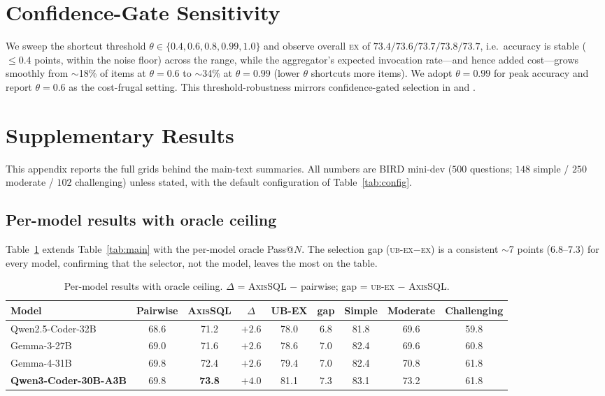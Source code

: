 \documentclass{article}
\newcommand{\sys}{\textsc{AxisSQL}\xspace}
\newcommand{\ex}{\textsc{ex}\xspace}
\begin{document}
\section{Confidence-Gate Sensitivity}
\label{app:gate}
We sweep the shortcut threshold $\theta\in\{0.4,0.6,0.8,0.99,1.0\}$ and observe overall \ex{} of $73.4/73.6/73.7/73.8/73.7$, i.e.\ accuracy is stable ($\le 0.4$ points, within the noise floor) across the range, while the aggregator's expected invocation rate---and hence added cost---grows smoothly from $\sim$18\% of items at $\theta{=}0.6$ to $\sim$34\% at $\theta{=}0.99$ (lower $\theta$ shortcuts more items). We adopt $\theta{=}0.99$ for peak accuracy and report $\theta{=}0.6$ as the cost-frugal setting. This threshold-robustness mirrors confidence-gated selection in \citet{lee2026aggagent} and \citet{li2026deepeye}.

\section{Supplementary Results}
\label{app:supp}

This appendix reports the full grids behind the main-text summaries. All numbers are BIRD mini-dev ($500$ questions; $148$ simple / $250$ moderate / $102$ challenging) unless stated, with the default configuration of Table~\ref{tab:config}.

\subsection{Per-model results with oracle ceiling}
\label{app:permodel}
Table~\ref{tab:s-permodel} extends Table~\ref{tab:main} with the per-model oracle Pass@$N$. The selection gap (\textsc{ub-ex}$-$\ex) is a consistent $\sim$7 points ($6.8$--$7.3$) for every model, confirming that the selector, not the model, leaves the most on the table.

\begin{table}[h]
\centering\small
\caption{Per-model results with oracle ceiling. $\Delta$ = \sys{} $-$ pairwise; gap = \textsc{ub-ex} $-$ \sys.}
\label{tab:s-permodel}
\begin{tabular}{@{}lcccccccc@{}}
\toprule
\textbf{Model} & \textbf{Pairwise} & \textbf{\sys} & $\Delta$ & \textbf{UB-EX} & \textbf{gap} & \textbf{Simple} & \textbf{Moderate} & \textbf{Challenging} \\
\midrule
Qwen2.5-Coder-32B    & 68.6 & 71.2 & $+2.6$ & 78.0 & 6.8 & 81.8 & 69.6 & 59.8 \\
Gemma-3-27B          & 69.0 & 71.6 & $+2.6$ & 78.6 & 7.0 & 82.4 & 69.6 & 60.8 \\
Gemma-4-31B          & 69.8 & 72.4 & $+2.6$ & 79.4 & 7.0 & 82.4 & 70.8 & 61.8 \\
\textbf{Qwen3-Coder-30B-A3B} & 69.8 & \textbf{73.8} & $+4.0$ & 81.1 & 7.3 & 83.1 & 73.2 & 61.8 \\
\bottomrule
\end{tabular}
\end{table}
\end{document}

